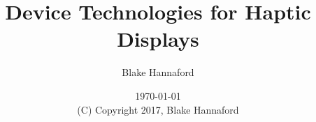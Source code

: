 \documentclass[oneside]{book}
\begin{document}
\setpagewiselinenumbers
\modulolinenumbers[5]

\setcounter{chapter}{0}


 \title{Device Technologies for Haptic Displays}

 \author{Blake Hannaford}

 \date{\today\\(C) Copyright 2017, Blake Hannaford}

 \maketitle 

\mainmatter

\linenumbers
%
%
%
%

% 
% 
% 
% 
% 
%
% 
\setcounter{chapter}{9}

% 
%
%
% 
% 
%  
% 
% 
% 


% 

%
\label{LastPage}
\end{document}

